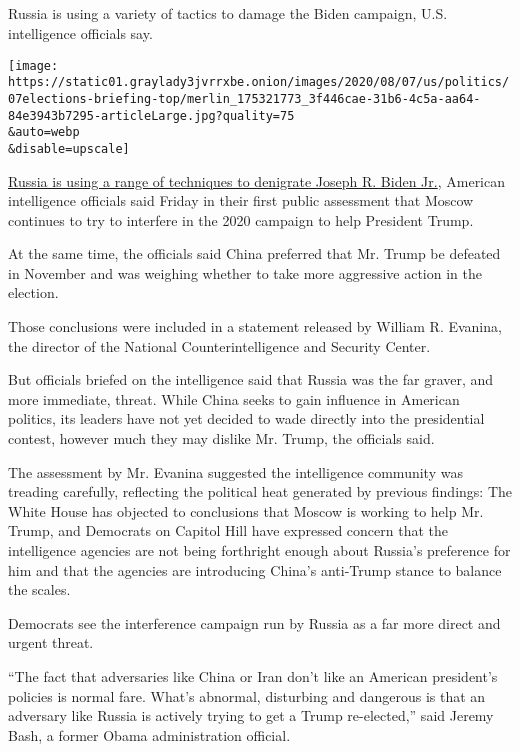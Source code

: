 \hypertarget{section}{%
\subsection{}\label{section}}

Russia is using a variety of tactics to damage the Biden campaign, U.S.
intelligence officials say.

\texttt{[image: https://static01.graylady3jvrrxbe.onion/images/2020/08/07/us/politics/07elections-briefing-top/merlin\_175321773\_3f446cae-31b6-4c5a-aa64-84e3943b7295-articleLarge.jpg?quality=75\\\&auto=webp\\\&disable=upscale]}

\href{https://www.nytimes3xbfgragh.onion/2020/08/07/us/politics/russia-china-trump-biden-election-interference.html}{Russia
is using a range of techniques to denigrate Joseph R. Biden Jr.},
American intelligence officials said Friday in their first public
assessment that Moscow continues to try to interfere in the 2020
campaign to help President Trump.

At the same time, the officials said China preferred that Mr. Trump be
defeated in November and was weighing whether to take more aggressive
action in the election.

Those conclusions were included in a statement released by William R.
Evanina, the director of the National Counterintelligence and Security
Center.

But officials briefed on the intelligence said that Russia was the far
graver, and more immediate, threat. While China seeks to gain influence
in American politics, its leaders have not yet decided to wade directly
into the presidential contest, however much they may dislike Mr. Trump,
the officials said.

The assessment by Mr. Evanina suggested the intelligence community was
treading carefully, reflecting the political heat generated by previous
findings: The White House has objected to conclusions that Moscow is
working to help Mr. Trump, and Democrats on Capitol Hill have expressed
concern that the intelligence agencies are not being forthright enough
about Russia's preference for him and that the agencies are introducing
China's anti-Trump stance to balance the scales.

Democrats see the interference campaign run by Russia as a far more
direct and urgent threat.

``The fact that adversaries like China or Iran don't like an American
president's policies is normal fare. What's abnormal, disturbing and
dangerous is that an adversary like Russia is actively trying to get a
Trump re-elected,'' said Jeremy Bash, a former Obama administration
official.

